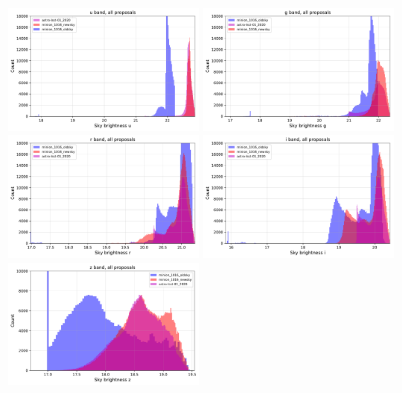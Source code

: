 \documentclass[DM,authoryear,toc]{lsstdoc}
\begin{document}
\begin{figure}[ht]
\centering
\includegraphics[width=0.45\textwidth]{figures/skybrightness_u_band_ONED_ComboBinnedData}
\includegraphics[width=0.45\textwidth]{figures/skybrightness_g_band_ONED_ComboBinnedData} \\
\includegraphics[width=0.45\textwidth]{figures/skybrightness_r_band_ONED_ComboBinnedData} 
\includegraphics[width=0.45\textwidth]{figures/skybrightness_i_band_ONED_ComboBinnedData} \\
\includegraphics[width=0.45\textwidth]{figures/skybrightness_z_band_ONED_ComboBinnedData}

\end{figure}
\end{document}
